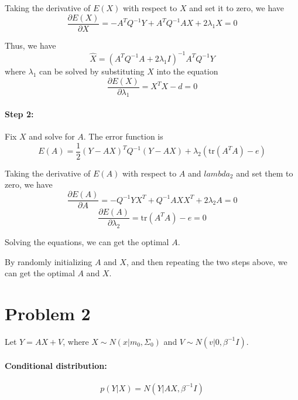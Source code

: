 \documentclass[a4paper,12pt]{article}
\newcommand{\pard}[2]{\frac{\partial #1}{\partial #2}}
\begin{document}
Taking the derivative of $E(X)$ with respect to $X$ and set it to zero, we have
\begin{equation*}
	\pard{E(X)}{X} = - A^T Q^{-1} Y + A^T Q^{-1} A X + 2 \lambda_1 X = 0
\end{equation*}

Thus, we have
\begin{equation*}
	\hat{X} = (A^T Q^{-1} A + 2 \lambda_1 I)^{-1} A^T Q^{-1} Y
\end{equation*}
where $\lambda_1$ can be solved by substituting $\hat{X}$ into the equation
\begin{equation*}
	\pard{E(X)}{\lambda_1} = X^T X - d = 0
\end{equation*}

\paragraph{Step 2:}
Fix $X$ and solve for $A$. The error function is
\begin{equation*}
	E(A) = \frac{1}{2} (Y - AX)^T Q^{-1} (Y - AX) + \lambda_2 (\text{tr}(A^T A) - e)
\end{equation*}

Taking the derivative of $E(A)$ with respect to $A$ and $lambda_2$ and set them to zero, we have
\begin{equation*}
	\pard{E(A)}{A} = - Q^{-1} Y X^T + Q^{-1} A X X^T + 2 \lambda_2 A = 0
\end{equation*}
\begin{equation*}
	\pard{E(A)}{\lambda_2} = \text{tr}(A^T A) - e = 0
\end{equation*}

Solving the equations, we can get the optimal $A$.

By randomly initializing $A$ and $X$, and then repeating the two steps above, we can get the optimal $A$ and $X$.

\section*{Problem 2}

Let $Y = AX + V$, where $X \sim N(x|m_0, \Sigma_0)$ and $V \sim N(v|0, \beta^{-1} I)$.

\paragraph{Conditional distribution:}
\begin{equation*}
	p(Y|X) = N(Y|AX, \beta^{-1} I)
\end{equation*}
\end{document}
